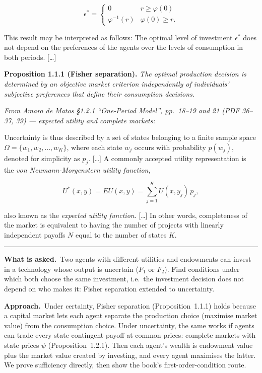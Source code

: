 \documentclass[11pt,a4paper]{article}
\numberwithin{equation}{section}
\newcommand{\asked}{\par\medskip\noindent\textbf{What is asked.}~}
\newcommand{\approach}{\par\smallskip\noindent\textbf{Approach.}~}
\newcommand{\stmtend}{\par\endgroup\nopagebreak\noindent\rule{\linewidth}{0.4pt}\par\medskip}
\begin{document}
\[\epsilon^* = \begin{cases} 0 & r \ge \varphi(0) \\ \varphi^{-1}(r) & \varphi(0) \ge r. \end{cases}\]

This result may be interpreted as follows: The optimal level of investment \(\epsilon^*\) does not
depend on the preferences of the agents over the levels of consumption in both periods. {[}\ldots{]}

\textbf{Proposition 1.1.1 (Fisher separation).} \emph{The optimal production decision is determined
by an objective market criterion independently of individuals' subjective preferences that define
their consumption decisions.}

\emph{From Amaro de Matos §1.2.1 ``One-Period Model'', pp.~18--19 and 21 (PDF 36--37, 39) ---
expected utility and complete markets:}

Uncertainty is thus described by a set of states belonging to a finite sample space
\(\Omega = \{w_1, w_2, \dots, w_K\}\), where each state \(w_j\) occurs with probability \(p(w_j)\),
denoted for simplicity as \(p_j\). {[}\ldots{]} A commonly accepted utility representation is the
\emph{von Neumann-Morgenstern utility function},

\[U^*(x, y) = EU(x, y) = \sum_{j=1}^{K} U(x, y_j)\, p_j,\]

also known as the \emph{expected utility function}. {[}\ldots{]} In other words, completeness of the
market is equivalent to having the number of projects with linearly independent payoffs \(N\) equal
to the number of states \(K\).
\stmtend

\asked Two agents with different utilities and endowments can invest in a technology whose
output is uncertain ($F_1$ or $F_2$). Find conditions under which both choose the same
investment, i.e.\ the investment decision does not depend on who makes it: Fisher separation
extended to uncertainty.

\approach Under certainty, Fisher separation (Proposition~1.1.1) holds because a capital market
lets each agent separate the production choice (maximise market value) from the consumption
choice. Under uncertainty, the same works if agents can trade every state-contingent payoff at
common prices: complete markets with state prices $\psi$ (Proposition~1.2.1). Then each agent's
wealth is endowment value plus the market value created by investing, and every agent maximises
the latter. We prove sufficiency directly, then show the book's first-order-condition route.
\end{document}
